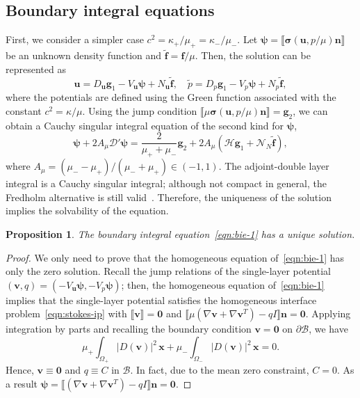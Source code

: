 \documentclass[preprint,11pt]{elsarticle}
\newtheorem{proposition}{Proposition}
\theoremstyle{remark}
\newcommand{\jump}[1]{\llbracket#1\rrbracket}
\newcommand{\grad}[1]{\nabla #1}
\newcommand{\mc}[1]{\mathcal{#1}}
\newcommand{\wt}[1]{\widetilde{#1}}
\newcommand{\bm}[1]{\boldsymbol{#1}}
\begin{document}
\subsection{Boundary integral equations}
First, we consider a simpler case $c^2 = \kappa_+/\mu_+ = \kappa_-/\mu_-$.
Let $\bm \psi = \jump{\bm \sigma(\bm u, p/\mu)\bm n}$ be an unknown density function and $\wt{\bm f} = \bm f/\mu$. Then, the solution can be represented as
\begin{equation}
    \bm u = D_{\bm u} \bm g_1 - V_{\bm u} \bm \psi  + N_{\bm u} \wt {\bm f}, \quad \wt p = D_p \bm g_1 - V_p \bm \psi + N_p \wt {\bm f},
\end{equation}
where the potentials are defined using the Green function associated with the constant $c^2 = \kappa/\mu$.
Using the jump condition $\jump{\mu \bm \sigma(\bm u, p/\mu)\bm n} = \bm g_2$, we can obtain a Cauchy singular integral equation of the second kind for $\bm \psi$,
\begin{equation}\label{eqn:bie-1}
    \bm \psi + 2 A_\mu \mc D'\bm \psi = \frac{2}{\mu_++\mu_-}\bm g_2 + 2 A_\mu (\mc H \bm g_1 + \mc N_N \wt {\bm f}) ,
\end{equation}
where $A_\mu = (\mu_- - \mu_+)/(\mu_- + \mu_+) \in (-1,1)$.
The adjoint-double layer integral is a Cauchy singular integral; although not compact in general, the Fredholm alternative is still valid~\cite{HsiaoWendland2008}. Therefore, the uniqueness of the solution implies the solvability of the equation.
\begin{proposition}\label{thm:uniq-1}
    The boundary integral equation~\eqref{eqn:bie-1} has a unique solution.
\end{proposition}
\begin{proof}
    We only need to prove that the homogeneous equation of~\eqref{eqn:bie-1} has only the zero solution. Recall the jump relations of the single-layer potential $(\bm v, q)=(-V_{\bm u}\bm\psi, -V_p\bm \psi)$; then, the homogeneous equation of~\eqref{eqn:bie-1} implies that the single-layer potential satisfies the homogeneous interface problem~\eqref{eqn:stokes-ip} with $\jump{\bm v} =\bm 0$ and $\jump{\mu(\grad \bm v+\grad\bm v^T) - qI}\bm n = \bm 0$. Applying integration by parts and recalling the boundary condition $\bm v = \bm 0$ on $\partial\mc B$, we have
    \begin{equation}
        \mu_+\int_{\Omega_+}|D(\bm v)|^2\,\bm x + \mu_-\int_{\Omega_-}|D(\bm v)|^2\,\bm x = 0.
    \end{equation}
    Hence, $\bm v \equiv\bm 0$ and $q\equiv C$ in $\mc B$. In fact, due to the mean zero constraint, $C = 0$. As a result $\bm \psi = \jump{(\grad \bm v+\grad\bm v^T) - qI}\bm n = \bm 0$.
\end{proof}
\end{document}
